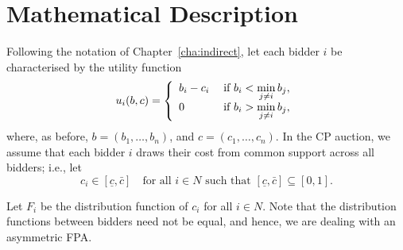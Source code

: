 \section{Mathematical Description} %
\label{sec:mathematical_description_approximation}

Following the notation of Chapter~\ref{cha:indirect}, let each bidder $i$ be characterised by the utility function
\begin{equation}
  \label{eq:utility_approximation}
    u_i(b,c) = \left\{
  \begin{array}{l l}
    b_i-c_i & \;\text{if } b_i < \displaystyle\min_{j\neq i}b_j,\\
    0 & \;\text{if } b_i > \displaystyle\min_{j\neq i}b_j,
  \end{array}\right.
\end{equation}
where, as before, $b = (b_1,\ldots,b_n)$, and $c = (c_1,\ldots,c_n)$. In the CP auction, we assume that each bidder $i$ draws their cost from common support across all bidders; i.e., let
\begin{equation*}
  c_i\in [\underline{c}, \bar{c}] \quad\text{for all } i\in N \text{ such that } [\underline{c}, \bar{c}]\subseteq [0, 1].
\end{equation*}

Let $F_i$ be the distribution function of $c_i$ for all $i\in N$. Note that the distribution functions between bidders need not be equal, and hence, we are dealing with an asymmetric FPA.

